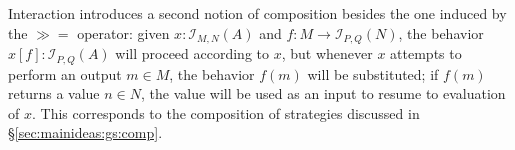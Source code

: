 \documentclass[acmsmall,timestamp,review,anonymous]{acmart}
\newcommand{\kw}[1]{\ensuremath{ \mathsf{#1} }}
\newcommand{\bind}{\gg\!\!=}
\begin{document}
Interaction introduces a second notion of composition
besides the one induced by the $\bind$ operator:
given
$x : \mathcal{I}_{M,N}(A)$ and
$f : M \rightarrow \mathcal{I}_{P,Q}(N)$,
the behavior $x[f] : \mathcal{I}_{P,Q}(A)$
will proceed according to $x$,
but whenever $x$ attempts to perform an output $m \in M$,
the behavior $f(m)$ will be substituted;
if $f(m)$ returns a value $n \in N$,
the value will be used as an input to resume to evaluation of $x$.
This corresponds to the composition of strategies
discussed in \S\ref{sec:mainideas:gs:comp}.


%
\end{document}
